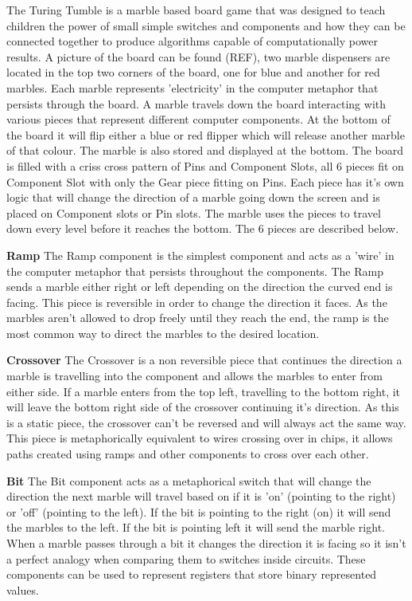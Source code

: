 \documentclass{l4proj}
\begin{document}
The Turing Tumble is a marble based board game that was designed to teach children the power of small simple switches and components and how they can be connected together to produce algorithms capable of computationally power results. A picture of the board can be found (REF), two marble dispensers are located in the top two corners of the board, one for blue and another for red marbles. Each marble represents 'electricity' in the computer metaphor that persists through the board. A marble travels down the board interacting with various pieces that represent different computer components. At the bottom of the board it will flip either a blue or red flipper which will release another marble of that colour. The marble is also stored and displayed at the bottom. The board is filled with a criss cross pattern of Pins and Component Slots, all 6 pieces fit on Component Slot with only the Gear piece fitting on Pins. Each piece has it's own logic that will change the direction of a marble going down the screen and is placed on Component slots or Pin slots. The marble uses the pieces to travel down every level before it reaches the bottom. The 6 pieces are described below.

\textbf{Ramp} 
The Ramp component is the simplest component and acts as a 'wire' in the computer metaphor that persists throughout the components. The Ramp sends a marble either right or left depending on the direction the curved end is facing. This piece is reversible in order to change the direction it faces. As the marbles aren't allowed to drop freely until they reach the end, the ramp is the most common way to direct the marbles to the desired location.

\textbf{Crossover}
The Crossover is a non reversible piece that continues the direction a marble is travelling into the component and allows the marbles to enter from either side.
If a marble enters from the top left, travelling to the bottom right, it will leave the bottom right side of the crossover continuing it's direction. As this is a static piece, the crossover can't be reversed and will always act the same way. This piece is metaphorically equivalent to wires crossing over in chips, it allows paths created using ramps and other components to cross over each other.

\textbf{Bit}
The Bit component acts as a metaphorical switch that will change the direction the next marble will travel based on if it is 'on' (pointing to the right) or 'off' (pointing to the left). If the bit is pointing to the right (on) it will send the marbles to the left. If the bit is pointing left it will send the marble right. When a marble passes through a bit it changes the direction it is facing so it isn't a perfect analogy when comparing them to switches inside circuits. These components can be used to represent registers that store binary represented values.
\end{document}
